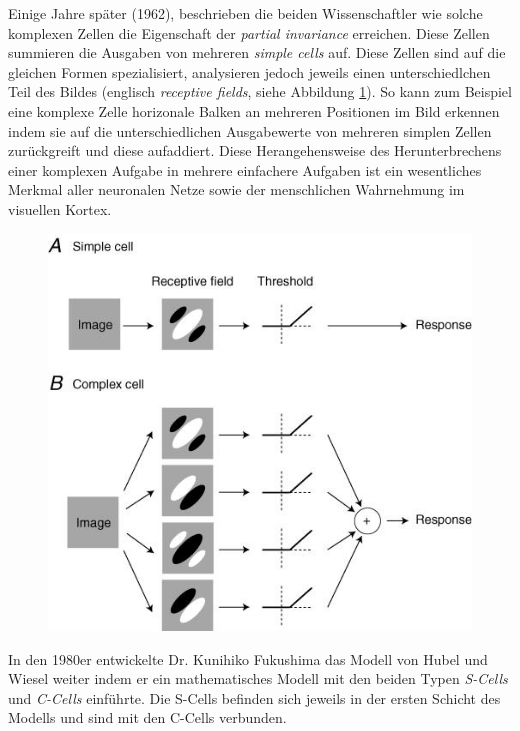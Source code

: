 Einige Jahre später (1962), beschrieben die beiden Wissenschaftler wie solche komplexen Zellen die Eigenschaft der \emph{partial invariance} erreichen. Diese Zellen summieren die Ausgaben von mehreren \emph{simple cells} auf. Diese Zellen sind auf die gleichen Formen spezialisiert, analysieren jedoch jeweils einen unterschiedlchen Teil des Bildes (englisch \emph{receptive fields}, siehe Abbildung \ref{fig:simpleVsComplex}). So kann zum Beispiel eine komplexe Zelle horizonale Balken an mehreren Positionen im Bild erkennen indem sie auf die unterschiedlichen Ausgabewerte von mehreren simplen Zellen zurückgreift und diese aufaddiert. Diese Herangehensweise des Herunterbrechens einer komplexen Aufgabe in mehrere einfachere Aufgaben ist ein wesentliches Merkmal aller neuronalen Netze sowie der menschlichen Wahrnehmung im visuellen Kortex. 

\begin{figure}[!htb]
	\centering
	\includegraphics[width=.6\linewidth]{img/simpleVsComplex}
	\label{fig:simpleVsComplex}
\end{figure}

In den 1980er entwickelte Dr. Kunihiko Fukushima das Modell von Hubel und Wiesel weiter indem er ein mathematisches Modell mit den beiden Typen \emph{S-Cells} und \emph{C-Cells} einführte. Die S-Cells befinden sich jeweils in der ersten Schicht des Modells und sind mit den C-Cells verbunden. 

